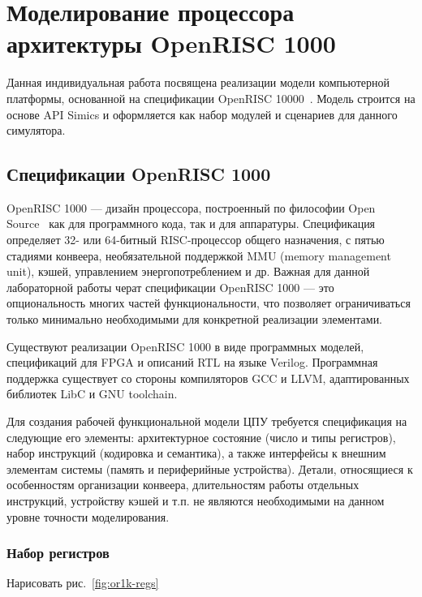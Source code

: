 \chapter{Моделирование процессора архитектуры OpenRISC 1000}\label{chap:lab06}

Данная индивидуальная работа посвящена реализации модели компьютерной платформы, основанной на спецификации OpenRISC 10000~\cite{or1k-spec}. Модель строится на основе API Simics и оформляется как набор модулей и сценариев для данного симулятора.

\section{Спецификации OpenRISC 1000}

OpenRISC 1000 --- дизайн процессора, построенный по философии Open Source~\cite{open-source-definition-ru} как для программного кода, так и для аппаратуры. Спецификация определяет 32- или 64-битный RISC-процессор общего назначения, с пятью стадиями конвеера, необязательной поддержкой MMU (\abbr memory management unit), кэшей, управлением энергопотреблением и др. Важная для данной лабораторной работы черат спецификации OpenRISC 1000 --- это опциональность многих частей функциональности, что позволяет ограничиваться только минимально необходимыми для конкретной реализации элементами.

Существуют реализации OpenRISC 1000 в виде программных моделей, спецификаций для FPGA и описаний RTL на языке Verilog. Программная поддержка существует со стороны компиляторов GCC и LLVM, адаптированных библиотек LibC и GNU toolchain.

Для создания рабочей функциональной модели ЦПУ требуется спецификация на следующие его элементы: архитектурное состояние (число и типы регистров), набор инструкций (кодировка и семантика), а также интерфейсы к внешним элементам системы (память и периферийные устройства). Детали, относящиеся к особенностям организации конвеера, длительностям работы отдельных инструкций, устройству кэшей и т.п. не являются необходимыми на данном уровне точности моделирования.

\subsection{Набор регистров}

\todo Нарисовать рис.~\ref{fig:or1k-regs}

